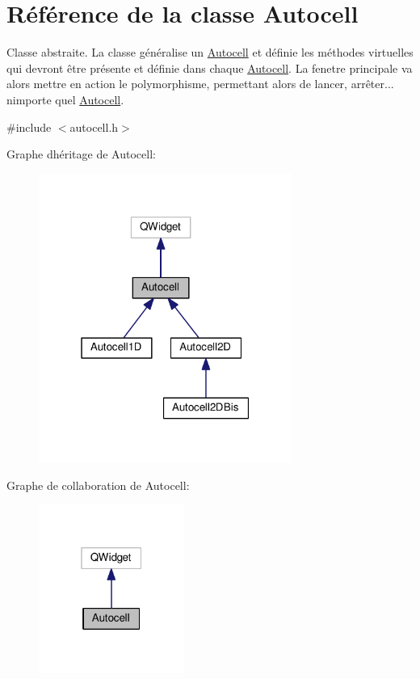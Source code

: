 \hypertarget{class_autocell}{}\section{Référence de la classe Autocell}
\label{class_autocell}


Classe abstraite. La classe généralise un \hyperlink{class_autocell}{Autocell} et définie les méthodes virtuelles qui devront être présente et définie dans chaque \hyperlink{class_autocell}{Autocell}. La fenetre principale va alors mettre en action le polymorphisme, permettant alors de lancer, arrêter... n\textquotesingle{}importe quel \hyperlink{class_autocell}{Autocell}.  




{\ttfamily \#include $<$autocell.\+h$>$}



Graphe d\textquotesingle{}héritage de Autocell\+:
\nopagebreak
\begin{figure}[H]
\begin{center}
\leavevmode
\includegraphics[width=235pt]{class_autocell__inherit__graph}
\end{center}
\end{figure}


Graphe de collaboration de Autocell\+:\nopagebreak
\begin{figure}[H]
\begin{center}
\leavevmode
\includegraphics[width=135pt]{class_autocell__coll__graph}
\end{center}
\end{figure}
